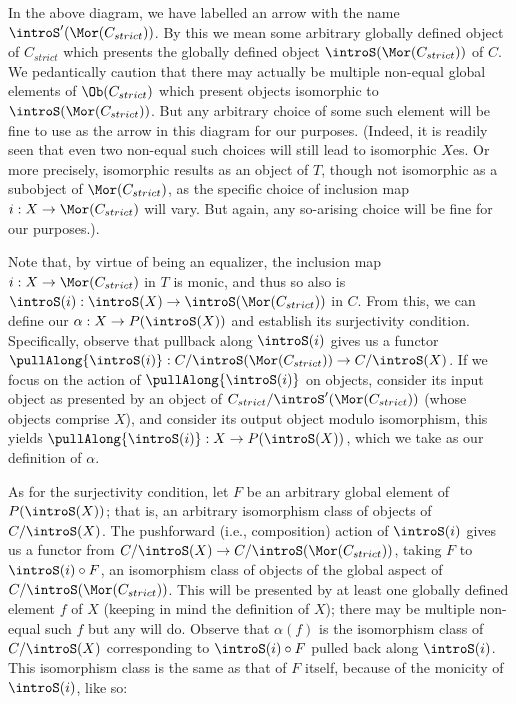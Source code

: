 In the above diagram, we have labelled an arrow with the name $\introS'(\Mor(C_{strict}))$. By this we mean some arbitrary globally defined object of $C_{strict}$ which presents the globally defined object $\introS(\Mor(C_{strict}))$ of $C$. We pedantically caution that there may actually be multiple non-equal global elements of $\Ob(C_{strict})$ which present objects isomorphic to $\introS(\Mor(C_{strict}))$. But any arbitrary choice of some such element will be fine to use as the arrow in this diagram for our purposes. (Indeed, it is readily seen that even two non-equal such choices will still lead to isomorphic $X$es. Or more precisely, isomorphic results as an object of $T$, though not isomorphic as a subobject of $\Mor(C_{strict})$, as the specific choice of inclusion map $i : X \to \Mor(C_{strict})$ will vary. But again, any so-arising choice will be fine for our purposes.).

Note that, by virtue of being an equalizer, the inclusion map $i : X \to \Mor(C_{strict})$ in $T$ is monic, and thus so also is $\introS(i) : \introS(X) \to \introS(\Mor(C_{strict}))$ in $C$. From this, we can define our $\alpha : X \to P(\introS(X))$ and establish its surjectivity condition. Specifically, observe that pullback along $\introS(i)$ gives us a functor $\pullAlong{\introS(i)} : C/\introS(\Mor(C_{strict})) \to C/\introS(X)$. If we focus on the action of $\pullAlong{\introS(i)}$ on objects, consider its input object as presented by an object of $C_{strict}/\introS'(\Mor(C_{strict}))$ (whose objects comprise $X$), and consider its output object modulo isomorphism, this yields $\pullAlong{\introS(i)} : X \to P(\introS(X))$, which we take as our definition of $\alpha$.

As for the surjectivity condition, let $F$ be an arbitrary global element of $P(\introS(X))$; that is, an arbitrary isomorphism class of objects of $C/\introS(X)$. The pushforward (i.e., composition) action of $\introS(i)$ gives us a functor from $C/\introS(X) \to C/\introS(\Mor(C_{strict}))$, taking $F$ to $\introS(i) \circ F$, an isomorphism class of objects of the global aspect of $C/\introS(\Mor(C_{strict}))$. This will be presented by at least one globally defined element $f$ of $X$ (keeping in mind the definition of $X$); there may be multiple non-equal such $f$ but any will do. Observe that $\alpha(f)$ is the isomorphism class of $C/\introS(X)$ corresponding to $\introS(i) \circ F$ pulled back along $\introS(i)$. This isomorphism class is the same as that of $F$ itself, because of the monicity of $\introS(i)$, like so:

